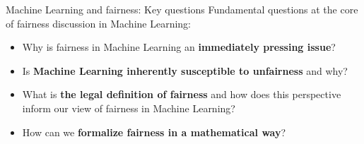 \begin{frame}{Machine Learning and fairness: Key questions}
    Fundamental questions at the core of fairness discussion in Machine Learning:
    
    \begin{itemize}
        \item Why is fairness in Machine Learning an \textbf{immediately pressing issue}?
        \item Is \textbf{Machine Learning inherently susceptible to unfairness} and why?
        \item What is \textbf{the legal definition of fairness} and how does this perspective inform our view of fairness in Machine Learning?
        \item How can we \textbf{formalize fairness in a mathematical way}?
    \end{itemize}
\end{frame}